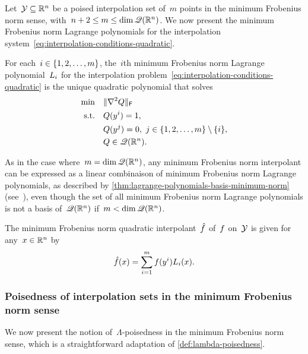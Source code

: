 Let~$\xpt \subseteq \R^n$ be a poised interpolation set of~$m$ points in the minimum Frobenius norm sense, with~$n + 2 \le m \le \dim \mathscr{Q}(\mathbb{R}^n)$.
We now present the minimum Frobenius norm Lagrange polynomials for the interpolation system~\cref{eq:interpolation-conditions-quadratic}.

\begin{definition}
    \label{def:lagrange-polynomials-minimum-norm}
    For each~$i \in \{1, 2, \dots, m\}$, the~$i$th minimum Frobenius norm Lagrange polynomial~$\lagp[i]$ for the interpolation problem~\cref{eq:interpolation-conditions-quadratic} is the unique quadratic polynomial that solves
    \begin{align*}
        \min        & \quad \lVert\nabla^2 Q\rVert_{\mathsf{F}}\\
        \text{s.t.} & \quad Q(y^i) = 1,\\
                    & \quad Q(y^j) = 0, ~ j \in \{1, 2, \dots, m\} \setminus \{i\},\\
                    & \quad Q \in \mathscr{Q}(\mathbb{R}^n).
    \end{align*}
\end{definition}

As in the case where~$m = \dim \mathscr{Q}(\mathbb{R}^n)$, any minimum Frobenius norm interpolant can be expressed as a linear combinaison of minimum Frobenius norm Lagrange polynomials, as described by \cref{thm:lagrange-polynomials-basis-minimum-norm} (see~\cite[\S~3]{Powell_2004b}), even though the set of all minimum Frobenius norm Lagrange polynomials is not a basis of~$\mathscr{Q}(\mathbb{R}^n)$ if~$m < \dim \mathscr{Q}(\mathbb{R}^n)$.

\begin{theorem}
    \label{thm:lagrange-polynomials-basis-minimum-norm}
    The minimum Frobenius norm quadratic interpolant~$\objm$ of~$f$ on~$\xpt$ is given for any~$x \in \mathbb{R}^n$ by
    \begin{equation*}
        \objm(x) = \sum_{i = 1}^m \obj(y^i) \lagp[i](x).
    \end{equation*}
\end{theorem}

\subsubsection{Poisedness of interpolation sets in the minimum Frobenius norm sense}

We now present the notion of~$\Lambda$-poisedness in the minimum Frobenius norm sense, which is a straightforward adaptation of \cref{def:lambda-poisedness}.

